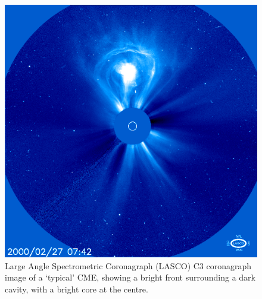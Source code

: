 \begin{figure}[t!]
\begin{center}
\includegraphics[scale=0.5]{images/lasco_c3}
\caption{Large Angle Spectrometric Coronagraph (LASCO) C3 coronagraph image of a \textquoteleft typical' CME, showing  a bright front surrounding a dark cavity, with a bright core at the centre.}
\label{fig:lasco_c3}
\end{center}
\end{figure}


